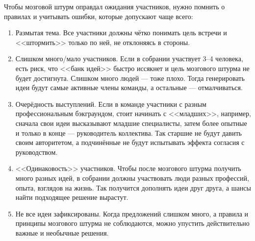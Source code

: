 Чтобы мозговой штурм оправдал ожидания участников, нужно помнить о правилах и учитывать ошибки, которые допускают чаще всего:

\begin{enumerate}
\item Размытая тема. Все участники должны чётко понимать цель встречи и <<штормить>> только по ней, не отклоняясь в стороны.

\item Слишком много/мало участников. Если в собрании участвует 3–4 человека, есть риск, что <<банк идей>> быстро иссякнет и цель мозгового штурма не будет достигнута. Слишком много людей — тоже плохо. Тогда генерировать идеи будут самые активные члены команды, а остальные — отмалчиваться.

\item Очерёдность выступлений. Если в команде участники с разным профессиональным бэкграундом, стоит начинать с <<младших>>, например, сначала свои идеи высказывают младшие специалисты, затем более опытные и только в конце — руководитель коллектива. Так старшие не будут давить своим авторитетом, а подчинённые не будут испытывать эффекта согласия с руководством.

\item <<Одинаковость>> участников. Чтобы после мозгового штурма получить много разных идей, в собрании должны участвовать люди разных профессий, опыта, взглядов на жизнь. Так получится дополнять идеи друг друга, а шансы найти подходящее решение вырастут.

\item Не все идеи зафиксированы. Когда предложений слишком много, а правила и принципы мозгового штурма не соблюдаются, можно упустить действительно важные и необычные решения.
\end{enumerate}
